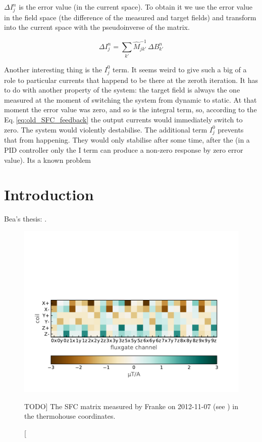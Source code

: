 $\Delta I^n_j$ is the error value (in the current space). To obtain it we use the error value in the field space (the difference of the measured and target fields) and transform into the current space with the pseudoinverse of the matrix.

\begin{equation}
  \Delta I^n_j = \sum_{k'} \hat{M}^{-1}_{jk'} \, \Delta B^n_{k'}
\end{equation}

Another interesting thing is the $I^0_j$ term. It seems weird to give such a big of a role to particular currents that happend to be there at the zeroth iteration. It has to do with another property of the system: the target field is always the one measured at the moment of switching the system from dynamic to static.
At that moment the error value was zero, and so is the integral term, so, according to the Eq.\,\ref{eq:old_SFC_feedback} the output currents would immediately switch to zero. The system would violently destabilise. The additional term $I^0_j$ prevents that from happening. They would only stabilise after some time, after the (in a PID controller only the I term can produce a non-zero response by zero error value). Its a known problem 





\section{Introduction}
Bea's thesis: \cite{Franke2013}.

\begin{figure}
  \myfloatalign
  \includegraphics[width=.8\linewidth]{gfx/nEDM_SFC/nEDM_SFC_matrix}
  \caption
  [TODO]
  {The SFC matrix measured by Franke on 2012-11-07 (see \cite{Franke2013}) in the thermohouse coordinates.}
  \label{fig:nEDM_SFC_matrix}
\end{figure}

